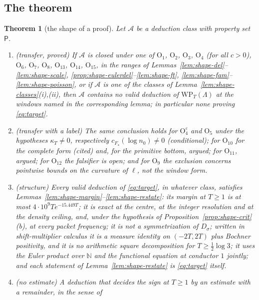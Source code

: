 \documentclass[11pt]{amsart}
\newtheorem{theorem}{Theorem}[section]
\theoremstyle{definition}
\theoremstyle{remark}
\newcommand{\N}{\mathbb N}
\begin{document}
\subsection{The theorem}

\begin{theorem}[the shape of a proof]\label{thm:shape}
Let $\mathcal A$ be a deduction class with property set $\mathsf P$.
\begin{enumerate}
\item[(A)] \textup{(transfer, proved)} If $\mathcal A$ is closed under one of $\mathrm O_1$, $\mathrm O_2$, $\mathrm O_3$, $\mathrm O_4$ (for
all $c>0$), $\mathrm O_6$, $\mathrm O_7$, $\mathrm O_8$, $\mathrm O_{13}$, $\mathrm O_{14}$, $\mathrm O_{15}$, in the ranges of
Lemmas~\ref{lem:shape-del}--\ref{lem:shape-scale}, \ref{prop:shape-eulerdel}--\ref{lem:shape-ft}, \ref{lem:shape-fam}--\ref{lem:shape-poisson},
or if $\mathcal A$ is one of the classes of Lemma~\ref{lem:shape-classes}(i),(ii), then $\mathcal A$ contains no valid deduction of
$\mathrm{WP}_T(\Lambda)$ at the windows named in the corresponding lemma; in particular none proving \eqref{eq:target}.
\item[(A$'$)] \textup{(transfer with a label)} The same conclusion holds for $\mathrm O_4^\varepsilon$ and $\mathrm O_5$ under the
hypotheses $\kappa_T\ne0$, respectively $c_{F_\star}(\log n_0)\ne0$ (conditional); for $\mathrm O_{10}$ for the complete form (cited) and,
for the primitive bottom, argued; for $\mathrm O_{11}$, argued; for $\mathrm O_{12}$ the falsifier is open; and for $\mathrm O_9$ the exclusion
concerns pointwise bounds on the curvature of $\ell$, not the window form.
\item[(B)] \textup{(structure)} Every valid deduction of \eqref{eq:target}, in whatever class, satisfies
Lemmas~\ref{lem:shape-margin}--\ref{lem:shape-restate}: its margin at $T\ge1$ is at most $4\cdot10^9Te^{-15.449T}$; it is exact at the
centre, at the integer resolution and at the density ceiling, and, under the hypothesis of Proposition~\ref{prop:shape-crit}(b), at every
packet frequency; it is not a symmetrization of $D_\sigma$; written in shift-multiplier calculus it is a measure identity on $(-2T,2T)$
plus Bochner positivity, and it is no arithmetic square decomposition for $T\ge\frac12\log3$; it uses the Euler product over $\N$ and the
functional equation at conductor $1$ jointly; and each statement of Lemma~\ref{lem:shape-restate} is \eqref{eq:target} itself.
\item[(B$'$)] \textup{(no estimate)} A deduction that decides the sign at $T\ge1$ by an estimate with a remainder, in the sense of

\end{enumerate}
\end{theorem}
\end{document}
